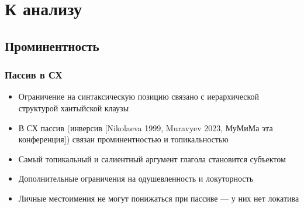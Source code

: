 \documentclass{beamer}
\begin{document}
\section{К анализу}
    \subsection{Проминентность}

    
        
        
        
        
        \begin{frame}
            \frametitle{Пассив в СХ}
        
            \begin{itemize}
                \item Ограничение на синтаксическую позицию связано с иерархической структурой хантыйской клаузы
                \item В СХ пассив (инверсив [Nikolaeva 1999, Muravyev 2023, МуМиМа эта конференция]) связан проминентностью и топикальностью
                \item Самый топикальный и салиентный аргумент глагола становится субъектом
                \item Дополнительные ограничения на одушевленность и локуторность 
                \item Личные местоимения не могут понижаться при пассиве — у них нет локатива
            \end{itemize}
        
        \end{frame}
\end{document}
